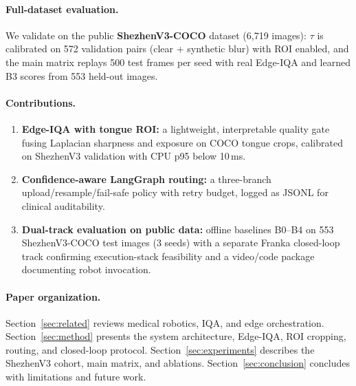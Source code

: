 \paragraph{Full-dataset evaluation.}
We validate on the public \textbf{ShezhenV3-COCO} dataset (6{,}719 images): $\tau$ is calibrated on 572 validation pairs (clear + synthetic blur) with ROI enabled, and the main matrix replays 500 test frames per seed with real Edge-IQA and learned B3 scores from 553 held-out images.

\paragraph{Contributions.}
\begin{enumerate}
  \item \textbf{Edge-IQA with tongue ROI:} a lightweight, interpretable quality gate fusing Laplacian sharpness and exposure on COCO tongue crops, calibrated on ShezhenV3 validation with CPU p95 below 10\,ms.
  \item \textbf{Confidence-aware LangGraph routing:} a three-branch upload/resample/fail-safe policy with retry budget, logged as JSONL for clinical auditability.
  \item \textbf{Dual-track evaluation on public data:} offline baselines B0--B4 on 553 ShezhenV3-COCO test images (3 seeds) with a separate Franka closed-loop track confirming execution-stack feasibility and a video/code package documenting robot invocation.
\end{enumerate}

\paragraph{Paper organization.}
Section~\ref{sec:related} reviews medical robotics, IQA, and edge orchestration.
Section~\ref{sec:method} presents the system architecture, Edge-IQA, ROI cropping, routing, and closed-loop protocol.
Section~\ref{sec:experiments} describes the ShezhenV3 cohort, main matrix, and ablations.
Section~\ref{sec:conclusion} concludes with limitations and future work.

